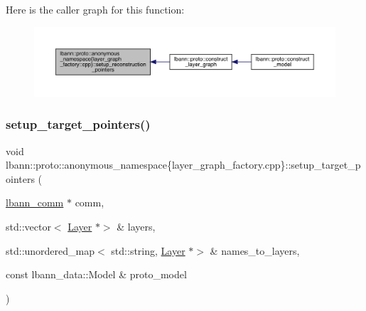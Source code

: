 Here is the caller graph for this function\+:\nopagebreak
\begin{figure}[H]
\begin{center}
\leavevmode
\includegraphics[width=350pt]{namespacelbann_1_1proto_1_1anonymous__namespace_02layer__graph__factory_8cpp_03_ac0c3ac49d16d6926308c336149a2f039_icgraph}
\end{center}
\end{figure}
\mbox{\label{namespacelbann_1_1proto_1_1anonymous__namespace_02layer__graph__factory_8cpp_03_a049fcca970d819d3c08bfdf71883de5c}} 
\subsubsection{\texorpdfstring{setup\+\_\+target\+\_\+pointers()}{setup\_target\_pointers()}}
{\footnotesize\ttfamily void lbann\+::proto\+::anonymous\+\_\+namespace\{layer\+\_\+graph\+\_\+factory.\+cpp\}\+::setup\+\_\+target\+\_\+pointers (\begin{DoxyParamCaption}\item[{\hyperlink{classlbann_1_1lbann__comm}{lbann\+\_\+comm} $\ast$}]{comm,  }\item[{std\+::vector$<$ \hyperlink{classlbann_1_1Layer}{Layer} $\ast$$>$ \&}]{layers,  }\item[{std\+::unordered\+\_\+map$<$ std\+::string, \hyperlink{classlbann_1_1Layer}{Layer} $\ast$$>$ \&}]{names\+\_\+to\+\_\+layers,  }\item[{const lbann\+\_\+data\+::\+Model \&}]{proto\+\_\+model }\end{DoxyParamCaption})}

